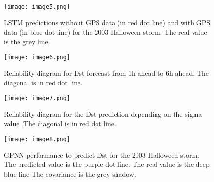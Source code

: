 \begin{figure}
	\texttt{[image: image5.png]}
	\caption{LSTM predictions without GPS data (in red dot line) and with GPS data (in blue dot line) for the 2003 Halloween storm. The real value is the grey line.}
	\label{fig:lstmpredswoGPS}
\end{figure}





\begin{figure}
	\texttt{[image: image6.png]}
	\caption{Reliability diagram for Dst forecast from 1h ahead to 6h ahead. The diagonal is in red dot line.}
	\label{fig:gpnnreliability}
\end{figure}






\begin{figure}
	\texttt{[image: image7.png]}
	\caption{Reliability diagram for the Dst prediction depending on the sigma value. The diagonal is in red dot line.}
	\label{fig:gpnnreliabilitysigma}	
\end{figure}




\begin{figure}
	\texttt{[image: image8.png]}
	\caption{GPNN performance to predict Dst for the 2003 Halloween storm. The predicted value is the purple dot line. The real value is the deep blue line The covariance is the grey shadow.}
    \label{fig:gpnnhalloween}
\end{figure}






